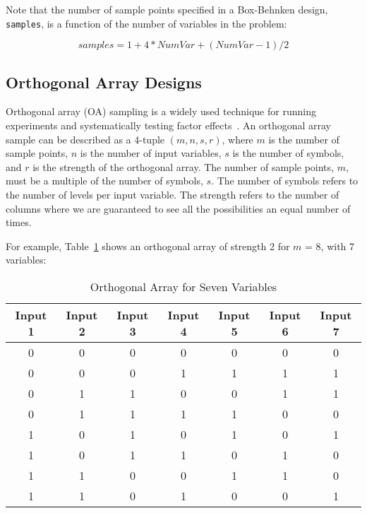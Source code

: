 Note that the number of sample points specified in a Box-Behnken design,
\texttt{samples}, is a function of the number of variables in the problem: 

\[
samples = 1 + 4*NumVar + (NumVar-1)/2
\]

\subsection{Orthogonal Array Designs}\label{dace:oas}

Orthogonal array (OA) sampling is a widely used technique for 
running experiments and systematically testing factor effects~\cite{Hed99}. 
An orthogonal array sample can be described as a 4-tuple $(m,n,s,r)$,
where $m$ is the number of sample points, $n$ is the number of input variables, 
$s$ is the number of symbols, and $r$ is the strength of the orthogonal array. 
The number of sample points, $m$, must be a multiple of the number of symbols, 
$s$. The number of symbols refers to the number of levels per input variable. 
The strength refers to the number of columns where we are guaranteed to 
see all the possibilities an equal number of times.

For example, Table~\ref{dace:table03} shows an orthogonal array of strength 2 for $m$ = 8, with 7 variables:

\begin{table}[ht]
 \caption{Orthogonal Array for Seven Variables}
 \label{dace:table03}
 \begin{center}
  \begin{tabular}{c|c|c|c|c|c|c}
  \hline
  Input 1 & Input 2 & Input 3 & Input 4 & Input 5 & Input 6 & Input 7\\ \hline \hline 
0 & 	0 &	0 &	0 & 	0 &	0 &	0  \\ \hline
0 &	0 &	0 &	1 &	1 &	1 &	1   \\ \hline
0 &	1 & 	1 & 	0 & 	0 &	1 &	1   \\ \hline
0 &	1 &	1 &	1 &	1 &	0 &	0    \\ \hline
1 &	0 &	1 &	0 &	1 &	0 &	1   \\ \hline
1 &	0 &	1 &	1 &	0 &	1 &	0 \\ \hline
1 &	1 &	0 &	0 &	1 &	1 &	0 \\ \hline
1 &	1 &	0 &	1 &	0 &	0 &	1 \\ \hline

  \end{tabular}
\end{center}
\end{table}


